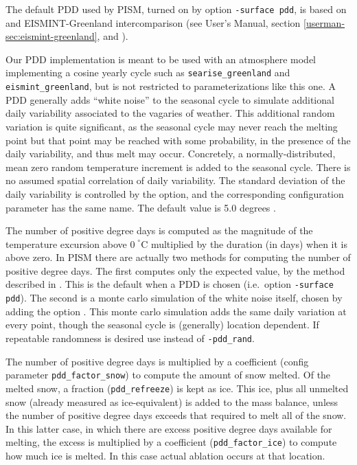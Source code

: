 \documentclass[titlepage,letterpaper,final]{scrartcl}
\begin{document}
The default PDD used by PISM, turned on by option \texttt{-surface pdd}, is based on \cite{CalovGreve05} and EISMINT-Greenland intercomparison (see User's Manual, section \ref*{userman-sec:eismint-greenland}, and \cite{RitzEISMINT}).

Our PDD implementation is meant to be used with an atmosphere model implementing a cosine yearly cycle such as \texttt{searise_greenland} and \texttt{eismint_greenland}, but is not restricted to parameterizations like this one. A PDD generally adds ``white noise'' to the seasonal cycle to simulate additional daily variability associated to the vagaries of weather.  This additional random variation is quite significant, as the seasonal cycle may never reach the melting point but that point may be reached with some probability, in the presence of the daily variability, and thus melt may occur.  Concretely, a normally-distributed, mean zero random temperature increment is added to the seasonal cycle. There is no assumed spatial correlation of daily variability. The standard deviation of the daily variability is controlled by the  option, and the corresponding configuration parameter has the same name. The default value is 5.0 degrees \cite{RitzEISMINT}.

The number of positive degree days is computed as the magnitude of the temperature excursion above $0\!\phantom{|}^\circ \text{C}$ multiplied by the duration (in days) when it is above zero. In PISM there are actually two methods for computing the number of positive degree days. The first computes only the expected value, by the method described in \cite{CalovGreve05}. This is the default when a PDD is chosen (i.e.~option \texttt{-surface pdd}). The second is a monte carlo simulation of the white noise itself, chosen by adding the option . This monte carlo simulation adds the same daily variation at every point, though the seasonal cycle is (generally) location dependent. If repeatable randomness is desired use  instead of \texttt{-pdd_rand}.

The number of positive degree days is multiplied by a coefficient (config parameter \texttt{pdd_factor_snow}) to compute the amount of snow melted. Of the melted snow, a fraction (\texttt{pdd_refreeze}) is kept as ice. This ice, plus all unmelted snow (already measured as ice-equivalent) is added to the mass balance, unless the number of positive degree days exceeds that required to melt all of the snow. In this latter case, in which there are excess positive degree days available for melting, the excess is multiplied by a coefficient (\texttt{pdd_factor_ice}) to compute how much ice is melted. In this case actual ablation occurs at that location.
\end{document}
